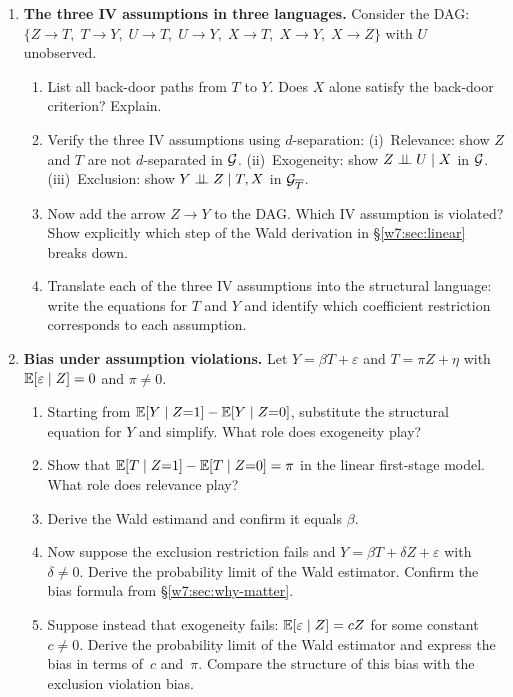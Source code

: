 \documentclass[master.tex]{subfiles}
\begin{document}
\begin{enumerate}

\item \textbf{The three IV assumptions in three languages.}
  Consider the DAG:
  $\{Z \to T,\; T \to Y,\; U \to T,\; U \to Y,\;
   X \to T,\; X \to Y,\; X \to Z\}$ with $U$ unobserved.
  \begin{enumerate}
    \item List all back-door paths from $T$ to $Y$.  Does $X$ alone
      satisfy the back-door criterion?  Explain.
    \item Verify the three IV assumptions using $d$-separation:
      (i)~Relevance: show $Z$ and $T$ are not $d$-separated in
      $\mathcal{G}$.
      (ii)~Exogeneity: show $Z \perp\!\!\!\perp U \mid X$ in $\mathcal{G}$.
      (iii)~Exclusion: show $Y \perp\!\!\!\perp Z \mid T, X$ in
      $\mathcal{G}_{\overline{T}}$.
    \item Now add the arrow $Z \to Y$ to the DAG.  Which IV
      assumption is violated?  Show explicitly which step of the
      Wald derivation in \S\ref{w7:sec:linear} breaks down.
    \item Translate each of the three IV assumptions into the
      structural language: write the equations for $T$ and $Y$
      and identify which coefficient restriction corresponds to
      each assumption.
  \end{enumerate}

\item \textbf{Bias under assumption violations.}
  Let $Y = \beta T + \varepsilon$ and $T = \pi Z + \eta$ with
  $\mathbb{E}[\varepsilon \mid Z] = 0$ and $\pi \neq 0$.
  \begin{enumerate}
    \item Starting from $\mathbb{E}[Y \mid Z{=}1] - \mathbb{E}[Y \mid Z{=}0]$,
      substitute the structural equation for $Y$ and simplify.
      What role does exogeneity play?
    \item Show that $\mathbb{E}[T \mid Z{=}1] - \mathbb{E}[T \mid Z{=}0] = \pi$
      in the linear first-stage model.  What role does relevance
      play?
    \item Derive the Wald estimand and confirm it equals $\beta$.
    \item Now suppose the exclusion restriction fails and
      $Y = \beta T + \delta Z + \varepsilon$ with $\delta \neq 0$.
      Derive the probability limit of the Wald estimator.  Confirm
      the bias formula from \S\ref{w7:sec:why-matter}.
    \item Suppose instead that exogeneity fails:
      $\mathbb{E}[\varepsilon \mid Z] = cZ$ for some constant $c \neq 0$.
      Derive the probability limit of the Wald estimator and
      express the bias in terms of~$c$ and~$\pi$.  Compare
      the structure of this bias with the exclusion violation bias.
  \end{enumerate}


\end{enumerate}
\end{document}
